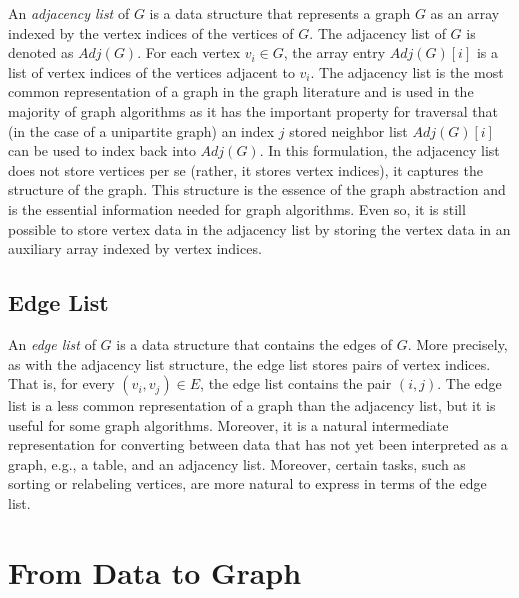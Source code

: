 An \emph{adjacency list} of $G$ is a data structure that represents a graph $G$ as an array
indexed by the vertex indices of the vertices of $G$.
The adjacency list of $G$ is denoted as $Adj(G)$.
For each vertex $v_i \in G$, the array entry $Adj(G)[i]$ is a list of
vertex indices of the vertices adjacent to $v_i$.
The adjacency list is the most common representation of a graph in the graph literature
and is used in the majority of graph algorithms as it has the important
property for traversal that (in the case of a unipartite graph)
an index $j$ stored neighbor list $Adj(G)[i]$ can
be used to index back into $Adj(G)$. In this formulation, the adjacency list
does not store vertices per se (rather, it stores vertex indices), it captures the
structure of the graph. This structure is the essence of the graph abstraction and
is the essential information needed for graph algorithms.
Even so, it is still possible to store vertex data in the adjacency list by storing
the vertex data in an auxiliary array indexed by vertex indices.

\subsection{Edge List}

An \emph{edge list} of $G$ is a data structure that contains the edges of $G$. More precisely, as
with the adjacency list structure, the edge list stores pairs of vertex indices. That is, for
every $(v_i, v_j) \in E$, the edge list contains the pair $(i, j)$. The edge list is
a less common representation of a graph than the adjacency list, but it is useful for
some graph algorithms. Moreover, it is a natural intermediate representation for
converting between data that has not yet been interpreted as a graph, e.g., a table,
and an adjacency list. Moreover, certain tasks, such as sorting or relabeling vertices, are
more natural to express in terms of the edge list.




\section{From Data to Graph}

